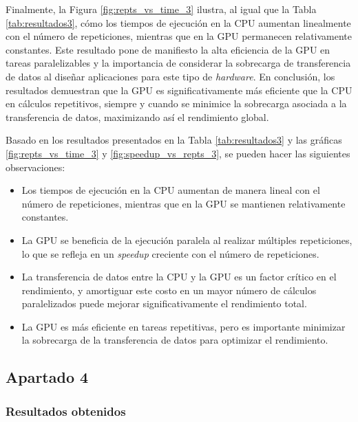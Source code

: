 \documentclass{article}
\begin{document}
			Finalmente, la Figura \ref{fig:repts_vs_time_3} ilustra, al igual que la Tabla \ref{tab:resultados3}, cómo los tiempos de ejecución en la CPU aumentan linealmente con el número de repeticiones, mientras que en la GPU permanecen relativamente constantes. Este resultado pone de manifiesto la alta eficiencia de la GPU en tareas paralelizables y la importancia de considerar la sobrecarga de transferencia de datos al diseñar aplicaciones para este tipo de \textit{hardware}. En conclusión, los resultados demuestran que la GPU es significativamente más eficiente que la CPU en cálculos repetitivos, siempre y cuando se minimice la sobrecarga asociada a la transferencia de datos, maximizando así el rendimiento global.

			Basado en los resultados presentados en la Tabla \ref{tab:resultados3} y las gráficas \ref{fig:repts_vs_time_3} y \ref{fig:speedup_vs_repts_3}, se pueden hacer las siguientes observaciones:

			\begin{itemize}

				\item Los tiempos de ejecución en la CPU aumentan de manera lineal con el número de repeticiones, mientras que en la GPU se mantienen relativamente constantes.

				\item La GPU se beneficia de la ejecución paralela al realizar múltiples repeticiones, lo que se refleja en un \textit{speedup} creciente con el número de repeticiones.

				\item La transferencia de datos entre la CPU y la GPU es un factor crítico en el rendimiento, y amortiguar este costo en un mayor número de cálculos paralelizados puede mejorar significativamente el rendimiento total.

				\item La GPU es más eficiente en tareas repetitivas, pero es importante minimizar la sobrecarga de la transferencia de datos para optimizar el rendimiento.

			\end{itemize}

	\subsection{Apartado 4}

		\subsubsection{Resultados obtenidos}
\end{document}

